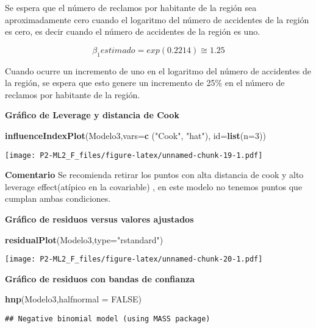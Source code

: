 \documentclass[]{article}
\newenvironment{Shaded}{\begin{snugshade}}{\end{snugshade}}
\newcommand{\DataTypeTok}[1]{\textcolor[rgb]{0.13,0.29,0.53}{#1}}
\newcommand{\DecValTok}[1]{\textcolor[rgb]{0.00,0.00,0.81}{#1}}
\newcommand{\KeywordTok}[1]{\textcolor[rgb]{0.13,0.29,0.53}{\textbf{#1}}}
\newcommand{\NormalTok}[1]{#1}
\newcommand{\OtherTok}[1]{\textcolor[rgb]{0.56,0.35,0.01}{#1}}
\newcommand{\StringTok}[1]{\textcolor[rgb]{0.31,0.60,0.02}{#1}}
\begin{document}
Se espera que el número de reclamos por habitante de la región sea
aproximadamente cero cuando el logaritmo del número de accidentes de la
región es cero, es decir cuando el número de accidentes de la región es
uno.

\[\beta_1  estimado = exp(0.2214) \cong 1.25\]

Cuando ocurre un incremento de uno en el logaritmo del número de
accidentes de la región, se espera que esto genere un incremento de 25\%
en el número de reclamos por habitante de la región.

\textbf{Gráfico de Leverage y distancia de Cook}

\begin{Shaded}
\begin{Highlighting}[]
\KeywordTok{influenceIndexPlot}\NormalTok{(Modelo3,}\DataTypeTok{vars=}\KeywordTok{c}\NormalTok{ (}\StringTok{"Cook"}\NormalTok{, }\StringTok{"hat"}\NormalTok{), }\DataTypeTok{id=}\KeywordTok{list}\NormalTok{(}\DataTypeTok{n=}\DecValTok{3}\NormalTok{))}
\end{Highlighting}
\end{Shaded}

\texttt{[image: P2-ML2\_F\_files/figure-latex/unnamed-chunk-19-1.pdf]}

\textbf{Comentario} Se recomienda retirar los puntos con alta distancia
de cook y alto leverage effect(atípico en la covariable) , en este
modelo no tenemos puntos que cumplan ambas condiciones.

\textbf{Gráfico de residuos versus valores ajustados}

\begin{Shaded}
\begin{Highlighting}[]
\KeywordTok{residualPlot}\NormalTok{(Modelo3,}\DataTypeTok{type=}\StringTok{"rstandard"}\NormalTok{)}
\end{Highlighting}
\end{Shaded}

\texttt{[image: P2-ML2\_F\_files/figure-latex/unnamed-chunk-20-1.pdf]}

\textbf{Gráfico de residuos con bandas de confianza}

\begin{Shaded}
\begin{Highlighting}[]
\KeywordTok{hnp}\NormalTok{(Modelo3,}\DataTypeTok{halfnormal =} \OtherTok{FALSE}\NormalTok{)}
\end{Highlighting}
\end{Shaded}

\begin{verbatim}
## Negative binomial model (using MASS package)
\end{verbatim}
\end{document}
